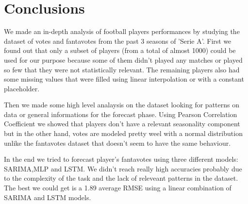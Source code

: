 \chapter {Conclusions}
We made an in-depth analysis of football players performances by studying the dataset of votes and fantavotes from the past 3 seasons of 'Serie A'. First we found out that only a subset of players (from a total of almost 1000) could be used for our purpose because some of them didn't played any matches or played so few that they were not statistically relevant. The remaining players also had some missing values that were filled using linear interpolation or with a constant placeholder.

Then we made some high level analaysis on the dataset looking for patterns on data or general informations for the forecast phase. Using Pearson Correlation Coefficient we showed that players don't have a relevant seasonality component but in the other hand, votes are modeled pretty weel with a normal distribution unlike the fantavotes dataset that doesn't seem to have the same behaviour.

In the end we tried to forecast player's fantavotes using three different models: SARIMA,MLP and LSTM. We didn't reach really high accuracies probably due to the complexity of the task and the lack of releveant patterns in the dataset. The best we could get is a 1.89 average RMSE using a linear combination of SARIMA and LSTM models.

